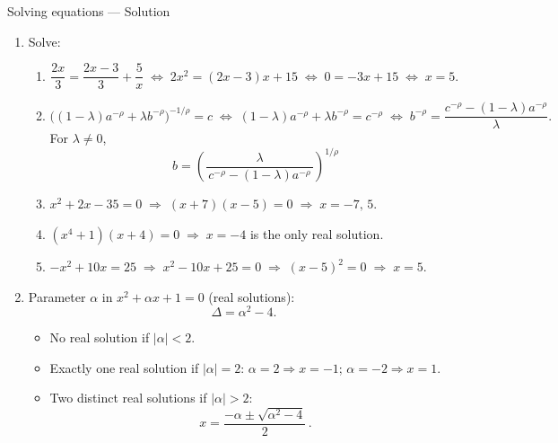 \documentclass[9pt]{beamer}
\begin{document}
\begin{frame}{Solving equations — Solution}
\footnotesize
\begin{enumerate}[leftmargin=0.5cm, label=\arabic*., rightmargin=0.2cm]

\item Solve:
\begin{enumerate}[leftmargin=0.5cm, label=(\alph*), rightmargin=0.2cm]

  \item 
  \[
  \dfrac{2x}{3}=\dfrac{2x-3}{3}+\dfrac{5}{x} 
  \;\Leftrightarrow\; 
  2x^2=(2x-3)x+15 
  \;\Leftrightarrow\; 
  0=-3x+15 
  \;\Leftrightarrow\; 
  \boxed{x=5}.
  \]

  \item 
  \[
  \bigl((1-\lambda)a^{-\rho}+\lambda b^{-\rho}\bigr)^{-1/\rho}=c
  \;\Leftrightarrow\; 
  (1-\lambda)a^{-\rho}+\lambda b^{-\rho}=c^{-\rho}
  \;\Leftrightarrow\; 
  b^{-\rho}=\frac{c^{-\rho}-(1-\lambda)a^{-\rho}}{\lambda}.
  \]
  For $\lambda\neq0$,
  \[
  \boxed{\,b=\left(\frac{\lambda}{\,c^{-\rho}-(1-\lambda)a^{-\rho}\,}\right)^{\!1/\rho}}
  \]
  
  \item $x^2+2x-35=0 \;\Rightarrow\; (x+7)(x-5)=0 \;\Rightarrow\; \boxed{x=-7,\,5}$.

  \item $(x^4+1)(x+4)=0 \;\Rightarrow\; \boxed{x=-4}$ is the only real solution.

  \item $-x^2+10x=25 \;\Rightarrow\; x^2-10x+25=0 \;\Rightarrow\; (x-5)^2=0 \;\Rightarrow\; \boxed{x=5}$.
\end{enumerate}

\item Parameter $\alpha$ in $x^2+\alpha x+1=0$ (real solutions):
\[
\Delta=\alpha^2-4.
\]
\begin{itemize}[leftmargin=0.6cm]
  \item No real solution if $\boxed{|\alpha|<2}$.
  \item Exactly one real solution if $\boxed{|\alpha|=2}$:
        \; $\alpha=2\Rightarrow x=-1$; \; $\alpha=-2\Rightarrow x=1$.
  \item Two distinct real solutions if $\boxed{|\alpha|>2}$:
        \[
        \boxed{\,x=\dfrac{-\alpha\pm\sqrt{\alpha^2-4}}{2}\,}.
        \]
\end{itemize}

\end{enumerate}
\end{frame}
\end{document}
